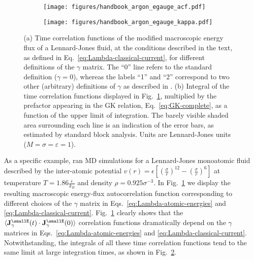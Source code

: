 \begin{figure}
    \centering
    \begin{subfigure}[tb]{1\textwidth}
    	\centering
        \texttt{[image: figures/handbook\_argon\_egauge\_acf.pdf]}
        \caption{}
        \label{fig:argon-gauge-acf}
    \end{subfigure}

    \begin{subfigure}[tb]{1\textwidth}
    	\centering
        \texttt{[image: figures/handbook\_argon\_egauge\_kappa.pdf]}
        \caption{}
        \label{fig:argon-gauge-kappa}
    \end{subfigure}
	\caption{(a) Time correlation functions of the modified macroscopic energy flux of a Lennard-Jones fluid, at the conditions described in the text, as defined in Eq.~\eqref{eq:Lambda-classical-current}, for different definitions of the $\gamma$ matrix. The ``0'' line refers to the standard definition ($\gamma = 0$), whereas the labels ``1'' and ``2'' correspond to two other (arbitrary) definitions of $\gamma$ as described in \cite{Ercole2016}.
    (b) Integral of the time correlation functions displayed in Fig.~\ref{fig:argon-gauge-acf}, multiplied by the prefactor appearing in the GK relation, Eq.~\eqref{eq:GK-complete}, as a function of the upper limit of integration. The barely visible shaded area surrounding each line is an indication of the error bars, as estimated by standard block analysis. Units are Lennard-Jones units ($M=\sigma=\varepsilon=1$). \label{fig:argon-gauge}}
\end{figure}

As a specific example, \cite{Ercole2016} ran MD simulations for a Lennard-Jones monoatomic fluid described by the inter-atomic potential $v(r)=\epsilon \left [ \left ( \frac{\sigma}{r}\right )^{12} - \left ( \frac{\sigma}{r}\right )^{6}\right ] $ at temperature $T=1.86 \frac{\epsilon}{k_B}$ and density $\rho=0.925 \sigma^{-3}$. In Fig.~\ref{fig:argon-gauge-acf} we display the resulting macroscopic energy-flux autocorrelation function corresponding to different choices of the $\gamma$ matrix in Eqs.~\eqref{eq:Lambda-atomic-energies} and \eqref{eq:Lambda-classical-current}. Fig.~\ref{fig:argon-gauge-acf} clearly shows that the $\langle \mathbf{J}^\smallE_{\gamma}(t) \cdot\mathbf{J}^\smallE_{\gamma}(0) \rangle$ correlation functions dramatically depend on the $\gamma$ matrices in Eqs.~\eqref{eq:Lambda-atomic-energies} and \eqref{eq:Lambda-classical-current}.  Notwithstanding, the integrals of all these time correlation functions tend to the same limit at large integration times, as shown in Fig.~\ref{fig:argon-gauge-kappa}.

